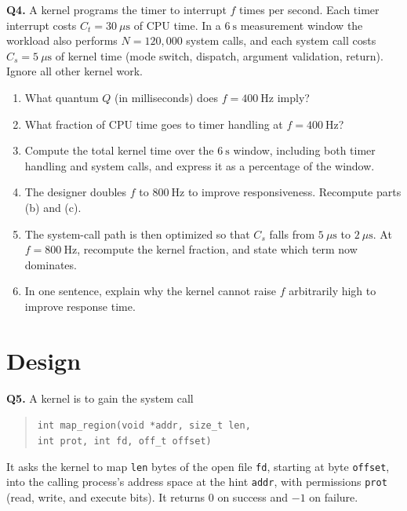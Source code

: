 \documentclass[11pt]{article}
\begin{document}
\textbf{Q4.} A kernel programs the timer to interrupt $f$ times per second. Each timer interrupt costs $C_t = 30\ \mu\text{s}$ of CPU time. In a $6\ \text{s}$ measurement window the workload also performs $N = 120{,}000$ system calls, and each system call costs $C_s = 5\ \mu\text{s}$ of kernel time (mode switch, dispatch, argument validation, return). Ignore all other kernel work.

\begin{enumerate}
  \item[(a)] What quantum $Q$ (in milliseconds) does $f = 400\ \text{Hz}$ imply?
  \item[(b)] What fraction of CPU time goes to timer handling at $f = 400\ \text{Hz}$?
  \item[(c)] Compute the total kernel time over the $6\ \text{s}$ window, including both timer handling and system calls, and express it as a percentage of the window.
  \item[(d)] The designer doubles $f$ to $800\ \text{Hz}$ to improve responsiveness. Recompute parts (b) and (c).
  \item[(e)] The system-call path is then optimized so that $C_s$ falls from $5\ \mu\text{s}$ to $2\ \mu\text{s}$. At $f = 800\ \text{Hz}$, recompute the kernel fraction, and state which term now dominates.
  \item[(f)] In one sentence, explain why the kernel cannot raise $f$ arbitrarily high to improve response time.
\end{enumerate}

\section{Design}

\textbf{Q5.} A kernel is to gain the system call
\begin{quote}
\texttt{int map\_region(void *addr, size\_t len,}\\
\texttt{\hspace*{2em}int prot, int fd, off\_t offset)}
\end{quote}
It asks the kernel to map \texttt{len} bytes of the open file \texttt{fd}, starting at byte \texttt{offset}, into the calling process's address space at the hint \texttt{addr}, with permissions \texttt{prot} (read, write, and execute bits). It returns $0$ on success and $-1$ on failure.
\end{document}
